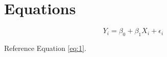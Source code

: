 



\chapter{Equations} \label{equations}

\begin{equation}
\label{eq:1}
	Y_i = \beta_0 + \beta_1 X_i + \epsilon_i
\end{equation}

Reference Equation \ref{eq:1}.

